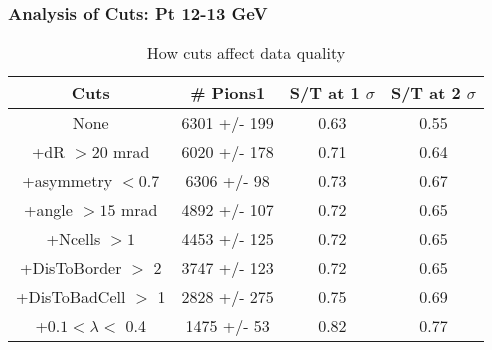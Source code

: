 \frame
{
\frametitle{Analysis of Cuts: Pt 12-13 GeV}
\begin{table}
\caption{How cuts affect data quality}
\centering
\begin{tabular}{c c c c}
\hline\hline
Cuts & \# Pions1 & S/T at 1 $\sigma$ & S/T at 2 $\sigma$ \\ [0.5ex]
\hline
None & 6301 +/-  199 & 0.63 & 0.55 \\ %
+dR $> 20$ mrad & 6020 +/-  178 & 0.71 & 0.64 \\ %
+asymmetry $< 0.7$ & 6306 +/-   98 & 0.73 & 0.67 \\ %
+angle $> 15$ mrad & 4892 +/-  107 & 0.72 & 0.65 \\ %
+Ncells $> 1$& 4453 +/-  125 & 0.72 & 0.65 \\ %
+DisToBorder $>$ 2 & 3747 +/-  123 & 0.72 & 0.65 \\ %
+DisToBadCell $>$ 1& 2828 +/-  275 & 0.75 & 0.69 \\ %
+$0.1 < \lambda <$ 0.4 & 1475 +/-   53 & 0.82 & 0.77 \\ %
[1ex]
\hline
\end{tabular}
\label{table:nonlin}
\end{table}
}
